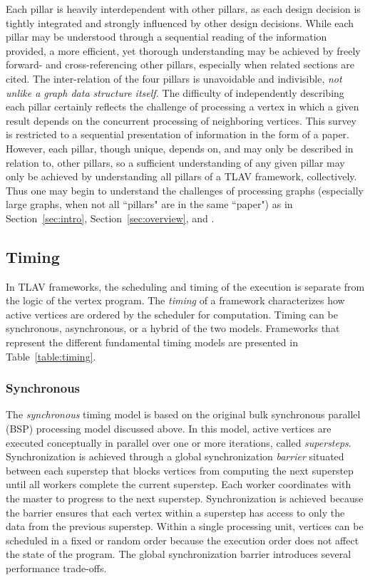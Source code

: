 \documentclass[reprint,twocolumn,showpacs,preprintnumbers,amsmath, aps,pre,amssymb]{revtex4-1}
\begin{document}
Each pillar is heavily interdependent with other pillars, as each design decision is tightly integrated and strongly influenced by other design decisions.  While each pillar may be understood through a sequential reading of the information provided, a more efficient, yet thorough understanding may be achieved by freely forward- and cross-referencing other pillars, especially when related sections are cited.  The inter-relation of the four pillars is unavoidable and indivisible, \textit{not unlike a graph data structure itself.}  The difficulty of independently describing each pillar certainly reflects the challenge of processing a vertex in which a given result depends on the concurrent processing of neighboring vertices.  This survey is restricted to a sequential presentation of information in the form of a paper.  However, each pillar, though unique, depends on, and may only be described in relation to, other pillars, so a sufficient understanding of any given pillar may only be achieved by understanding all pillars of a TLAV framework, collectively.  Thus one may begin to understand the challenges of processing graphs (especially large graphs, when not all ``pillars" are in the same ``paper") as in Section~\ref{sec:intro}, Section~\ref{sec:overview}, and \cite{Lumsdaine2007}.

\subsection{Timing}
\label{subsec:execution_policy}
In TLAV frameworks, the scheduling and timing of the execution is separate from the logic of the vertex program.  The \textit{timing} of a framework characterizes how active vertices are ordered by the scheduler for computation.  Timing can be synchronous, asynchronous, or a hybrid of the two models.  Frameworks that represent the different fundamental timing models are presented in Table~\ref{table:timing}.

\subsubsection{Synchronous}
\label{subsubsec:sync}
The \textit{synchronous} timing model is based on the original bulk synchronous parallel (BSP) processing model discussed above. In this model, active vertices are executed conceptually in parallel over one or more iterations, called \textit{supersteps}. Synchronization is achieved through a global synchronization \textit{barrier} situated between each superstep that blocks vertices from computing the next superstep until all workers complete the current superstep. Each worker coordinates with the master to progress to the next superstep. Synchronization is achieved because the barrier ensures that each vertex within a superstep has access to only the data from the previous superstep. Within a single processing unit, vertices can be scheduled in a fixed or random order because the execution order does not affect the state of the program.  The global synchronization barrier introduces several performance trade-offs.
\end{document}
